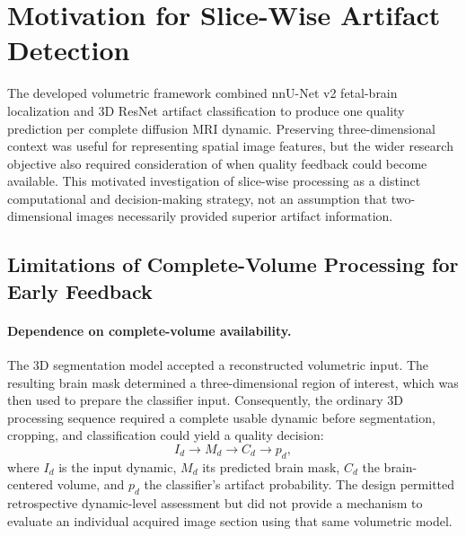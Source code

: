 \section{Motivation for Slice-Wise Artifact Detection}
\label{sec:motivation_2d}

The developed volumetric framework combined nnU-Net v2 fetal-brain localization and 3D ResNet artifact classification to produce one quality prediction per complete diffusion MRI dynamic. Preserving three-dimensional context was useful for representing spatial image features, but the wider research objective also required consideration of when quality feedback could become available. This motivated investigation of slice-wise processing as a distinct computational and decision-making strategy, not an assumption that two-dimensional images necessarily provided superior artifact information.

\subsection{Limitations of Complete-Volume Processing for Early Feedback}
\label{subsec:3d_feedback_limitations}

\paragraph{Dependence on complete-volume availability.}
The 3D segmentation model accepted a reconstructed volumetric input. The resulting brain mask determined a three-dimensional region of interest, which was then used to prepare the classifier input. Consequently, the ordinary 3D processing sequence required a complete usable dynamic before segmentation, cropping, and classification could yield a quality decision:
\begin{equation}
I_d\longrightarrow M_d\longrightarrow C_d\longrightarrow p_d,
\end{equation}
where $I_d$ is the input dynamic, $M_d$ its predicted brain mask, $C_d$ the brain-centered volume, and $p_d$ the classifier's artifact probability. The design permitted retrospective dynamic-level assessment but did not provide a mechanism to evaluate an individual acquired image section using that same volumetric model.

